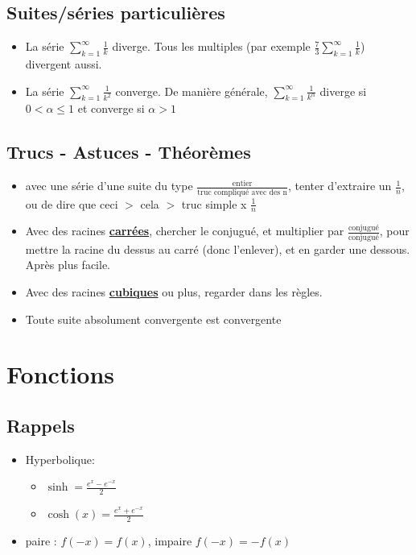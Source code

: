 \documentclass[12pt,a4paper]{article}
\newcommand{\somme}[2]{\ensuremath{\sum\limits_{#2}^{#1}}}
\newcommand{\evid}[1]{\textbf{\underline{#1}}}
\begin{document}
\subsection{Suites/séries particulières}
\begin{itemize}
	\item La série $\somme{\infty}{k=1}\frac{1}{k}$ diverge. Tous les multiples (par exemple $\frac{7}{3}\somme{\infty}{k=1}\frac{1}{k}$) divergent aussi.
	\item La série $\somme{\infty}{k=1}\frac{1}{k^2}$ converge. De manière générale, $\somme{\infty}{k=1}\frac{1}{k^\alpha}$ diverge si $0<\alpha\leq 1$ et converge si $\alpha > 1$
\end{itemize}
\subsection{Trucs - Astuces - Théorèmes}
\begin{itemize}
	\item avec une série d'une suite du type $\frac{\mbox{entier}}{\mbox{truc compliqué avec des n}}$, tenter d'extraire un $\frac{1}{n}$, ou de dire que ceci $>$ cela $>$ truc simple x $\frac{1}{n}$
	\item Avec des racines \evid{carrées}, chercher le conjugué, et multiplier par $\frac{\mbox{conjugué}}{\mbox{conjugué}}$, pour mettre la racine du dessus au carré (donc l'enlever), et en garder une dessous. Après plus facile.
	\item Avec des racines \evid{cubiques} ou plus, regarder dans les règles. 
	\item Toute suite absolument convergente est convergente
\end{itemize}
\section{Fonctions}
\subsection{Rappels}
\begin{itemize}
	\item Hyperbolique:
		\begin{itemize}
			\item $\sinh = \frac{e^x-e^{-x}}{2}$
			\item $\cosh(x) = \frac{e^x+e^{-x}}{2}$
		\end{itemize}
	\item paire : $f(-x) = f(x)$, impaire $f(-x) = -f(x)$
\end{itemize}
\end{document}
